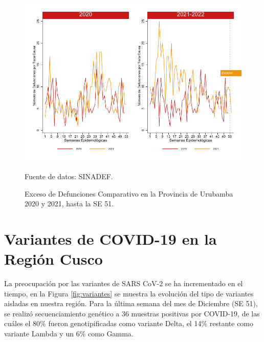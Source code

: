 \documentclass[12pt,a4paper,openany]{book}
\begin{document}
		\begin{figure}[h]
			\caption{Exceso de Defunciones Comparativo en la Provincia de Urubamba 2020 y 2021, hasta la SE 51.}\label{fig:exceso_urub}
			\begin{center}
				\includegraphics[width=0.7\linewidth]{../figuras/exceso_13}
			\end{center}
			{\footnotesize {Fuente de datos: SINADEF.}}
		\end{figure}
		
		\clearpage
		
		\clearpage
		
		\section* {Variantes de COVID-19 en la Región Cusco}
		\noindent La preocupación por las variantes de SARS CoV-2 se ha incrementado en el tiempo, en la Figura \ref{fig:variantes} se muestra la evolución del tipo de variantes aisladas en nuestra región. Para la última semana del mes de Diciembre (SE 51), se realizó secuenciamiento genético a 36 muestras positivas por COVID-19, de las cuáles el 80$\%$ fueron genotipificadas como variante Delta, el 14$\%$ restante como variante Lambda y un 6$\%$ como Gamma. 
		
\end{document}

